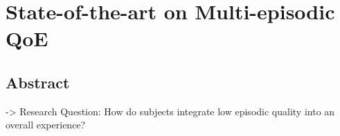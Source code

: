 \chapter{State-of-the-art on Multi-episodic QoE}\label{chap:05}
\section*{Abstract}

  -> Research Question: How do subjects integrate low episodic quality into an overall experience?
